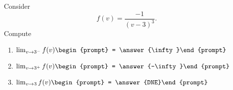 \documentclass{ximera}
\author{Bart Snapp}
\begin{document}
\begin{exercise}
Consider 
\[
f(v) = \frac{-1}{(v-3)^3}.
\]
Compute
\begin{enumerate}
\item $\lim_{v\to 3^- } f(v) \begin{prompt} = \answer{\infty}\end{prompt}$
\item $\lim_{v\to 3^+ } f(v) \begin{prompt} = \answer{-\infty}\end{prompt}$
\item $\lim_{v\to 3 } f(v) \begin{prompt} = \answer{DNE}\end{prompt}$
\end{enumerate}
\end{exercise}
\end{document}
